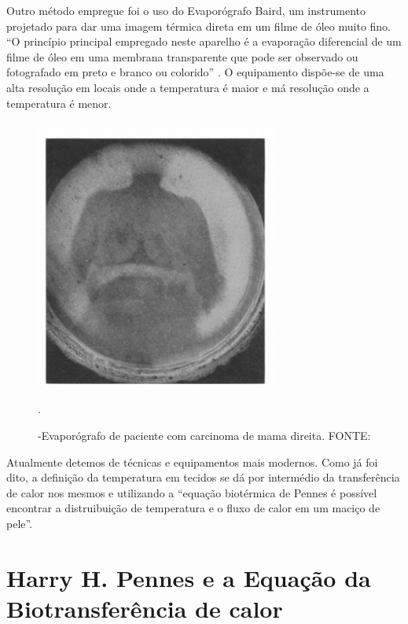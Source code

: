    Outro método empregue foi o uso do Evaporógrafo Baird,  um instrumento projetado para dar uma imagem térmica direta em um filme de óleo muito fino. ``O princípio principal empregado neste aparelho é a evaporação diferencial de um filme de óleo em uma membrana transparente que
pode ser observado ou fotografado em preto e
branco ou colorido'' \cite{Lawson}. O equipamento dispõe-se de uma alta resolução em locais onde a temperatura é maior e má resolução onde a temperatura é menor.

\begin{figure}[h]
\centering
\includegraphics[width=8cm]{figuras/Evaporografo.png}
\caption{-Evaporógrafo de paciente com carcinoma
de mama direita. FONTE: \cite{Lawson}}.
\label{figura 3:Evaporógrafo}
\end{figure}

 Atualmente detemos de técnicas e equipamentos mais modernos.  
Como já foi dito, a definição da temperatura em tecidos se dá por intermédio da transferência de calor nos mesmos e utilizando a ``equação biotérmica de Pennes é possível encontrar a distruibuição de temperatura e o fluxo de calor em um maciço de pele''\cite{Fabricio}. %






\section{Harry H. Pennes e a Equação da Biotransferência de calor}

